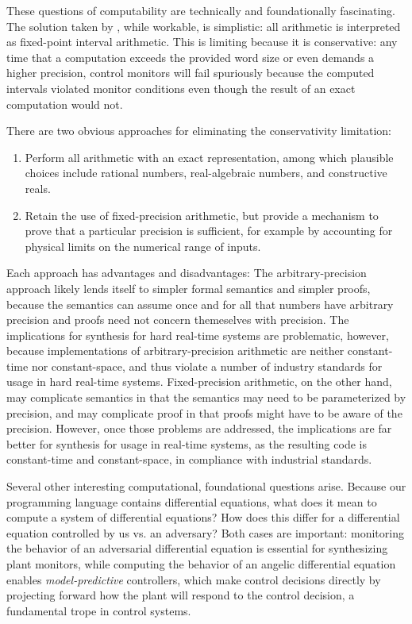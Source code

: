 These questions of computability are technically and foundationally fascinating.
The solution taken by \VeriPhy, while workable, is simplistic: all arithmetic is interpreted as fixed-point interval arithmetic.
This is limiting because it is conservative: any time that a computation exceeds the provided word size or even demands a higher precision, control monitors will fail spuriously because the computed intervals violated monitor conditions even though the result of an exact computation would not.

There are two obvious approaches for eliminating the conservativity limitation:
\begin{enumerate}
\item Perform all arithmetic with an exact representation, among which plausible choices include rational numbers, real-algebraic numbers, and constructive reals.
\item Retain the use of fixed-precision arithmetic, but provide a mechanism to prove that a particular precision is sufficient, for example by accounting for physical limits on the numerical range of inputs.
\end{enumerate}
Each approach has advantages and disadvantages: The arbitrary-precision approach likely lends itself to simpler formal semantics and simpler proofs, because the semantics can assume once and for all that numbers have arbitrary precision and proofs need not concern themeselves with precision.
The implications for synthesis for hard real-time systems are problematic, however, because implementations of arbitrary-precision arithmetic are neither constant-time nor constant-space, and thus violate a number of industry standards for usage in hard real-time systems.
Fixed-precision arithmetic, on the other hand, may complicate semantics in that the semantics may need to be parameterized by precision, and may complicate proof in that proofs might have to be aware of the precision.
However, once those problems are addressed, the implications are far better for synthesis for usage in real-time systems, as the resulting code is constant-time and constant-space, in compliance with industrial standards.

Several other interesting computational, foundational questions arise.
Because our programming language contains differential equations, what does it mean to compute a system of differential equations?
How does this differ for a differential equation controlled by us vs. an adversary?
Both cases are important: monitoring the behavior of an adversarial differential equation is essential for synthesizing plant monitors, while computing the behavior of an angelic differential equation enables \emph{model-predictive} controllers, which make control decisions directly by projecting forward how the plant will respond to the control decision, a fundamental trope in control systems.

